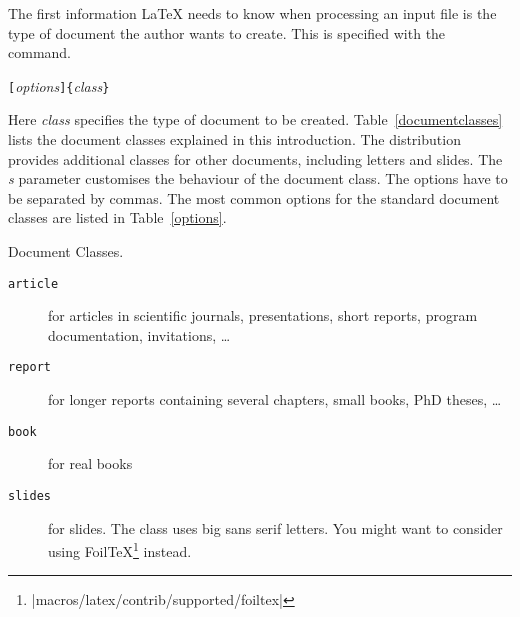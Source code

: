 The first information \LaTeX{} needs to know when processing an
input file is the type of document the author wants to create. This
is specified with the  command.
\begin{lscommand}
\verb|[|\emph{options}\verb|]{|\emph{class}\verb|}|
\end{lscommand}
\noindent Here \emph{class} specifies the type of document to be created.
Table~\ref{documentclasses} lists the document classes explained in
this introduction. The \LaTeXe{} distribution provides additional
classes for other documents, including letters and slides.  The
\emph{s} parameter customises the behaviour of the document
class. The options have to be separated by commas. The most common options for the standard document
classes are listed in
Table~\ref{options}.


\begin{table}[!bp]
\caption{Document Classes.} \label{documentclasses}
\begin{lined}{12cm}
\begin{description}
 
\item [\normalfont\texttt{article}] for articles in scientific journals, presentations,
  short reports, program documentation, invitations, \ldots
\item [\normalfont\texttt{report}] for longer reports containing several chapters, small
  books, PhD theses, \ldots {}
\item [\normalfont\texttt{book}] for real books 
\item [\normalfont\texttt{slides}] for slides. The class uses big sans serif
  letters. You might want to consider using Foil\TeX{}\footnote{%
        \CTANref|macros/latex/contrib/supported/foiltex|} instead.
\end{description}
\end{lined}
\end{table}

